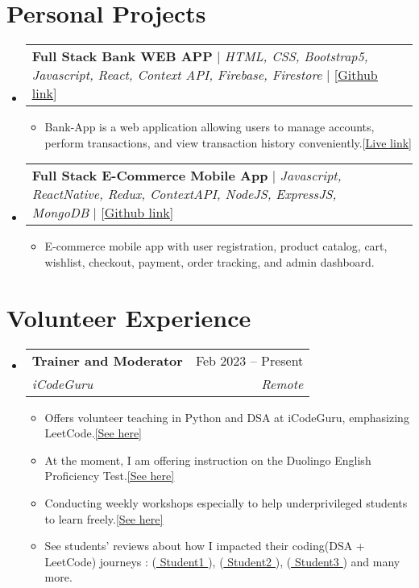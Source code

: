 \documentclass[letterpaper,11pt]{article}
\makeatletter
\newcommand{\resumeItem}[1]{
  \item\small{
    {#1 \vspace{-2pt}}
  }
}
\newcommand{\resumeSubheading}[4]{
  \vspace{-2pt}\item
    \begin{tabular*}{0.97\textwidth}[t]{l@{\extracolsep{\fill}}r}
      \textbf{#1} & #2 \\
      \textit{\small#3} & \textit{\small #4} \\
    \end{tabular*}\vspace{-7pt}
}
\newcommand{\resumeProjectHeading}[2]{
    \item
    \begin{tabular*}{0.97\textwidth}{l@{\extracolsep{\fill}}r}
      \small#1 & #2 \\
    \end{tabular*}\vspace{-7pt}
}
\newcommand{\resumeSubHeadingListStart}{\begin{itemize}[leftmargin=0.15in, label={}]}
\newcommand{\resumeSubHeadingListEnd}{\end{itemize}}
\newcommand{\resumeItemListStart}{\begin{itemize}}
\newcommand{\resumeItemListEnd}{\end{itemize}\vspace{-5pt}}
\makeatother
\begin{document}
\section{\textbf{Personal Projects}}
\resumeSubHeadingListStart
\resumeProjectHeading
{\textbf{{Full Stack Bank WEB APP}} $|$ \emph{HTML, CSS, Bootstrap5, Javascript, React, Context API, Firebase, Firestore} $|$ [{\href{https://github.com/Ahmadjajja/React_Bank}{\underline{Github link}}}]}{}
\resumeItemListStart
\resumeItem{Bank-App is a web application allowing users to manage accounts, perform
  transactions, and view transaction history conveniently.[{\href{https://jajja-bank-app.web.app/}{\underline{Live link}}}]}
\resumeItemListEnd
\resumeProjectHeading
{\textbf{{Full Stack E-Commerce Mobile App}} $|$ \emph{Javascript, ReactNative, Redux, ContextAPI, NodeJS,
    ExpressJS, MongoDB} $|$ [{\href{https://github.com/Ahmadjajja/E_Commerce_Mobile_App_Frontend}{\underline{Github link}}}]}{}
\resumeItemListStart
\resumeItem{E-commerce mobile app with user registration, product catalog, cart, wishlist,
  checkout, payment, order tracking, and admin dashboard.}
\resumeItemListEnd
\resumeSubHeadingListEnd
%


\section{\textbf{Volunteer Experience}}
\resumeSubHeadingListStart
\resumeSubheading
{Trainer and Moderator}{Feb 2023 -- Present}
{iCodeGuru}{Remote}
\resumeItemListStart
\resumeItem{Offers volunteer teaching in Python and DSA at iCodeGuru, emphasizing LeetCode.{\href{https://github.com/Ahmadjajja/LeetCode_Volunteer_Teaching}{\underline{[See here]}}}}
\resumeItem{At the moment, I am offering instruction on the Duolingo English Proficiency Test.{\href{https://www.linkedin.com/feed/update/urn:li:activity:7169346246216671232/}{\underline{[See here]}}}}
\resumeItem{Conducting weekly workshops especially to help underprivileged students to learn freely.{\href{https://github.com/Ahmadjajja/LeetCode_Volunteer_Teaching}{\underline{[See here]}}}}
\resumeItem{See students' reviews about how I impacted their coding(DSA + LeetCode) journeys : ({\href{https://www.linkedin.com/posts/sikander-nawaz_dsa-dsa-leetcode-activity-7170805639886106624-Kxka?utm_source=share&utm_medium=member_desktop}{\underline{ Student1 }}}), ({\href{https://www.linkedin.com/posts/syedshahzilimran_mastering-trees-unlocking-the-key-of-dsa-activity-7174974045019398144-DN_C?utm_source=share&utm_medium=member_desktop}{\underline{ Student2 }}}), ({\href{https://www.linkedin.com/feed/update/urn:li:activity:7173635314391920640/}{\underline{ Student3 }}}) and many more. }
\resumeItemListEnd
\resumeSubHeadingListEnd
%
\end{document}
